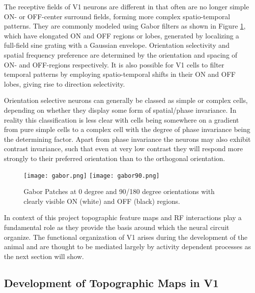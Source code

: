 The receptive fields of V1 neurons are different in that often are no
longer simple ON- or OFF-center surround fields, forming more complex
spatio-temporal patterns. They are commonly modeled using Gabor filters
as shown in Figure \ref{Gabor}, which have elongated ON and OFF
regions or lobes, generated by localizing a full-field sine grating
with a Gaussian envelope. Orientation selectivity and spatial
frequency preference are determined by the orientation and spacing of
ON- and OFF-regions respectively. It is also possible for V1 cells to
filter temporal patterns by employing spatio-temporal shifts in their
ON and OFF lobes, giving rise to direction selectivity.

Orientation selective neurons can generally be classed as simple or
complex cells, depending on whether they display some form of
spatial/phase invariance. In reality this classification is less clear
with cells being somewhere on a gradient from pure simple cells to a
complex cell with the degree of phase invariance being the determining
factor. Apart from phase invariance the neurons may also exhibit
contrast invariance, such that even at very low contrast they will
respond more strongly to their preferred orientation than to the
orthogonal orientation.

\begin{figure}
	\centering \texttt{[image: gabor.png]}
        \texttt{[image: gabor90.png]}
	\caption[Oriented Gabor patches.]{Gabor Patches at 0 degree and
      90/180 degree orientations with clearly visible ON (white) and
      OFF (black) regions.}
	\label{Gabor}
\end{figure}

In context of this project topographic feature maps and RF
interactions play a fundamental role as they provide the basis around
which the neural circuit organize. The functional organization of V1
arises during the development of the animal and are thought to be
mediated largely by activity dependent processes as the next section
will show.

\subsection{Development of Topographic Maps in V1}

